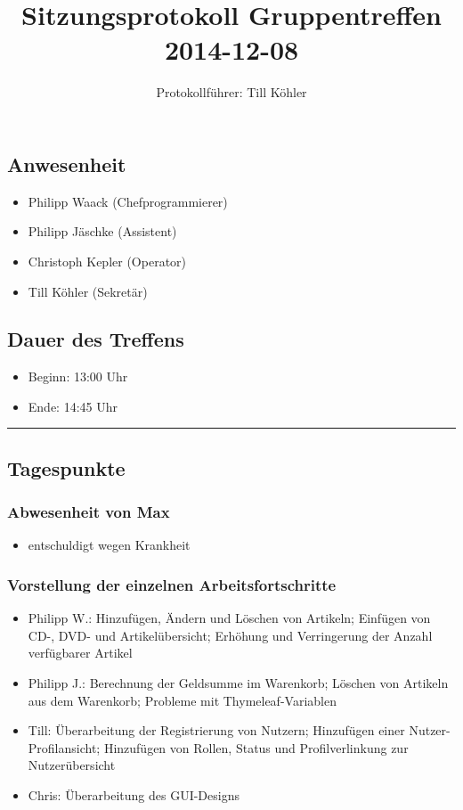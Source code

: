 \documentclass[12pt,a4paper]{article}
\author{Protokollführer: Till Köhler}
\title{Sitzungsprotokoll Gruppentreffen 2014-12-08}
\date{}
\begin{document}
\maketitle

\subsection*{Anwesenheit}
\medskip
\begin{itemize}
\item Philipp Waack (Chefprogrammierer)
\item Philipp Jäschke (Assistent)
\item Christoph Kepler (Operator)
\item Till Köhler (Sekretär)
\end{itemize}

\subsection*{Dauer des Treffens}
\medskip
\begin{itemize}
\item Beginn: 13:00 Uhr
\item Ende: 14:45 Uhr
\end{itemize}

\noindent\rule{\textwidth}{1pt}

\subsection*{Tagespunkte}
\medskip

\subsubsection*{Abwesenheit von Max}
\begin{itemize}
\item entschuldigt wegen Krankheit
\end{itemize}

\subsubsection*{Vorstellung der einzelnen Arbeitsfortschritte}
\begin{itemize}
\item Philipp W.: Hinzufügen, Ändern und Löschen von Artikeln; Einfügen von CD-, DVD- und Artikelübersicht; Erhöhung und Verringerung der Anzahl verfügbarer Artikel
\item Philipp J.: Berechnung der Geldsumme im Warenkorb; Löschen von Artikeln aus dem Warenkorb; Probleme mit Thymeleaf-Variablen
\item Till: Überarbeitung der Registrierung von Nutzern; Hinzufügen einer Nutzer-Profilansicht; Hinzufügen von Rollen, Status und Profilverlinkung zur Nutzerübersicht
\item Chris: Überarbeitung des GUI-Designs
\end{itemize}
\end{document}
